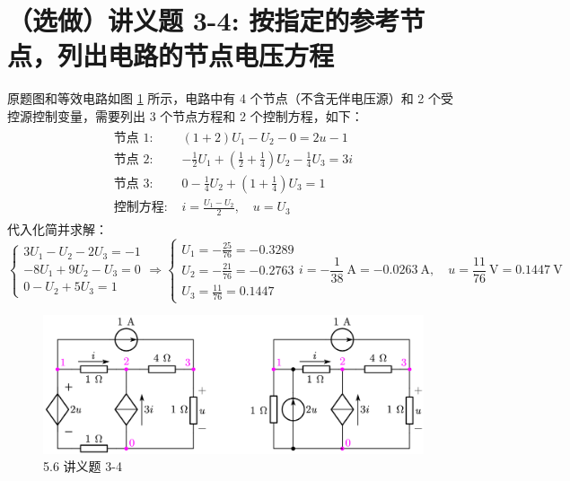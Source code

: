 \documentclass[UTF8]{report}
\theoremstyle{MyLineTheoremStyle} %
\theoremstyle{MyBlockTheoremStyle} %
\theoremstyle{MySubsubsectionStyle} %
\begin{document}
\section{（选做）讲义题 3-4: 按指定的参考节点，列出电路的节点电压方程}

原题图和等效电路如图 \ref{5.6 讲义题 3-4} 所示，电路中有 4 个节点（不含无伴电压源）和 2 个受控源控制变量，需要列出 3 个节点方程和 2 个控制方程，如下：
\begin{align}
\begin{matrix}
    \text{节点 1: } & (1 + 2)U_1 - U_2 - 0 = 2u-1\\
    \text{节点 2: } & -\frac{1}{2}U_1 + \left(\frac{1}{2} + \frac{1}{4}\right)U_2 - \frac{1}{4}U_3 = 3 i  \\
    \text{节点 3: } &  0-\frac{1}{4}U_2 + \left(1 + \frac{1}{4}\right)U_3 = 1 \\
    \text{控制方程: } & i = \frac{U_1 - U_2}{2},\quad u = U_3
\end{matrix}
\end{align}
代入化简并求解：
\begin{equation}
\begin{cases}
    3U_1 - U_2 -2 U_3 = -1\\ 
    -8U_1 + 9U_2 - U_3 = 0 \\ 
    0 - U_2 + 5U_3 = 1
\end{cases}\Longrightarrow 
\begin{cases}
    U_1 =  -\frac{25}{76}  = -0.3289 \\
    U_2 =  -\frac{21}{76}  = -0.2763 \\
    U_3 = \frac{11}{76}    = 0.1447  
\end{cases}
i = -\frac{1}{38}\ \mathrm{A} = -0.0263 \ \mathrm{A},\quad u = \frac{11}{76} \ \mathrm{V}= 0.1447 \ \mathrm{V}
\end{equation}

\begin{figure}[H]\centering
\includegraphics[width=0.8\columnwidth]{assets/5/5.6.png}
\caption{ 5.6 讲义题 3-4}\label{5.6 讲义题 3-4}
\end{figure}
\end{document}
